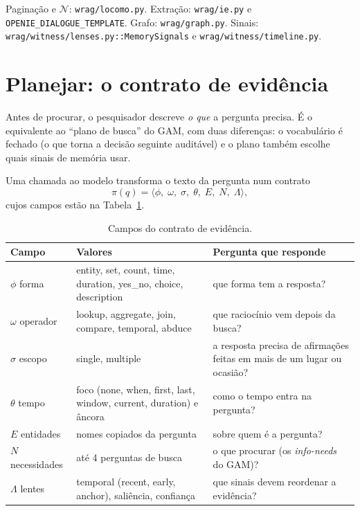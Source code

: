 \documentclass[11pt]{article}
\begin{document}
\begin{nocodigo}
Paginação e $\mathcal{N}$: \texttt{wrag/locomo.py}. Extração:
\texttt{wrag/ie.py} e \texttt{OPENIE\_DIALOGUE\_TEMPLATE}. Grafo:
\texttt{wrag/graph.py}. Sinais: \texttt{wrag/witness/lenses.py::MemorySignals}
e \texttt{wrag/witness/timeline.py}.
\end{nocodigo}

\section{Planejar: o contrato de evidência}\label{sec:contrato}

\begin{intuicao}
Antes de procurar, o pesquisador descreve \emph{o que} a pergunta precisa. É
o equivalente ao ``plano de busca'' do GAM, com duas diferenças: o vocabulário
é fechado (o que torna a decisão seguinte auditável) e o plano também escolhe
quais sinais de memória usar.
\end{intuicao}

Uma chamada ao modelo transforma o texto da pergunta num contrato
\begin{equation}
  \pi(q)=\langle \phi,\;\omega,\;\sigma,\;\theta,\;E,\;N,\;\Lambda\rangle,
  \label{eq:contrato}
\end{equation}
cujos campos estão na Tabela~\ref{tab:contrato}.

\begin{table}[h]
\centering\small
\caption{Campos do contrato de evidência.}\label{tab:contrato}
\begin{tabularx}{\textwidth}{@{}l>{\raggedright}p{4.6cm}X@{}}
\toprule
Campo & Valores & Pergunta que responde \\
\midrule
$\phi$ forma & entity, set, count, time, duration, yes\_no, choice, description & que forma tem a resposta? \\
$\omega$ operador & lookup, aggregate, join, compare, temporal, abduce & que raciocínio vem depois da busca? \\
$\sigma$ escopo & single, multiple & a resposta precisa de afirmações feitas em mais de um lugar ou ocasião? \\
$\theta$ tempo & foco (none, when, first, last, window, current, duration) e âncora & como o tempo entra na pergunta? \\
$E$ entidades & nomes copiados da pergunta & sobre quem é a pergunta? \\
$N$ necessidades & até 4 perguntas de busca & o que procurar (os \emph{info-needs} do GAM)? \\
$\Lambda$ lentes & temporal (recent, early, anchor), saliência, confiança & que sinais devem reordenar a evidência? \\
\bottomrule
\end{tabularx}
\end{table}
\end{document}
